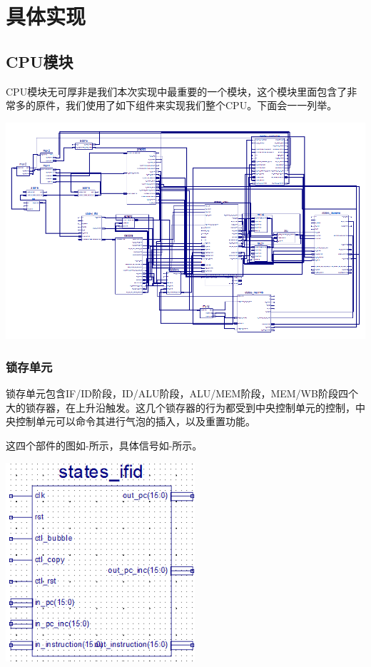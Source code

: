 \section{具体实现}

\subsection{CPU模块}

CPU模块无可厚非是我们本次实现中最重要的一个模块，这个模块里面包含了非常多的原件，我们使用了如下组件来实现我们整个CPU。下面会一一列举。

\begin{center}
    \includegraphics[width=14cm]{image/detail/detail_cpu.png}
    \label{fig:cpu_structure}
\end{center}

\subsubsection{锁存单元}

锁存单元包含IF/ID阶段，ID/ALU阶段，ALU/MEM阶段，MEM/WB阶段四个大的锁存器，在上升沿触发。这几个锁存器的行为都受到中央控制单元的控制，中央控制单元可以命令其进行气泡的插入，以及重置功能。

这四个部件的图如-所示，具体信号如-所示。

\begin{center}
    \includegraphics[width=7cm]{image/detail/detail_ifid.png}
    \label{fig:ifid}
\end{center}

